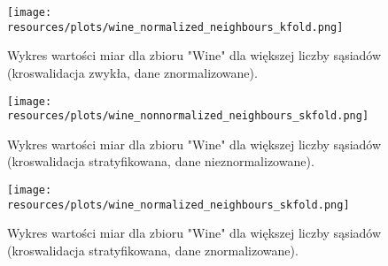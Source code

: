     \begin{figure}[H]
        \center
        \texttt{[image: resources/plots/wine\_normalized\_neighbours\_kfold.png]}
        \caption{Wykres wartości miar dla zbioru "Wine" dla większej liczby sąsiadów (kroswalidacja zwykła, dane znormalizowane).}
    \end{figure}

    \begin{figure}[H]
        \center
        \texttt{[image: resources/plots/wine\_nonnormalized\_neighbours\_skfold.png]}
        \caption{Wykres wartości miar dla zbioru "Wine" dla większej liczby sąsiadów (kroswalidacja stratyfikowana, dane nieznormalizowane).}
    \end{figure}

    \begin{figure}[H]
        \center
        \texttt{[image: resources/plots/wine\_normalized\_neighbours\_skfold.png]}
        \caption{Wykres wartości miar dla zbioru "Wine" dla większej liczby sąsiadów (kroswalidacja stratyfikowana, dane znormalizowane).}
    \end{figure}